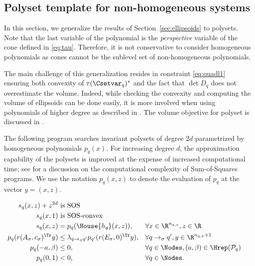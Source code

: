 \documentclass[11pt,twoside,a4paper,openright]{uclouvain-thesis}
\newcommand{\tr}{\to}
\newcommand{\trs}[1][\sigma]{\tr_{#1}}
\newcommand{\nqx}{n_{q,x}}
\newcommand{\Ps}{\mathcal{P}}
\begin{document}
\subsection{Polyset template for non-homogeneous systems}
\label{sec:controlsos}

In this section, we generalize the results of Section~\ref{sec:ellipsoids} to polysets.
Note that the last variable of the polynomial is the \emph{perspective} variable of the cone defined in \eqref{eq:tau}.
Therefore, it is not conservative to consider homogeneous polynomials as cones cannot be the sublevel set of non-homogeneous polynomials.

The main challenge of this generalization resides in constraint \eqref{eq:quadl1} ensuring both convexity of $\tau(\Csetvar_q)^*$ and the fact that $\det D_q$ does not overestimate the volume.
Indeed, while checking the convexity and computing the volume of ellipsoids can be done easily,
it is more involved when using polynomials of higher degree as described in .
The volume objective for polyset is discussed in .

The following program searches invariant polysets of degree $2d$ parametrized by homogeneous polynomials $p_q(x)$.
For increasing degree $d$, the approximation capability of the polysets is improved
at the expense of increased computational time; see  for a discussion on the computational complexity of Sum-of-Squares programs.
We use the notation $p_q(x, z)$ to denote the evaluation of $p_q$ at the vector $y = (x, z)$.

\begin{myprog}
  \label{prog:sos}
  \begin{align}
    \label{eq:sos}
    s_q(x, z) + z^{2d} & \text{ is SOS}\\
    \label{eq:sosconvex}
    s_q(x, 1) & \text{ is SOS-convex}\\
    \label{eq:sos_house}
    s_q(x, z) & = p_q(\House{h_q} (x, z)),
    && \forall x \in \R^{\nqx}, z \in \R\\
    \label{eq:soss}
    p_q(r(A_\sigma, c_\sigma)^\Tr y) & \leq \lambda_{q \trs q'} p_{q'}(r(E_\sigma, 0)^{\Tr} y),
    && \forall q \trs q', y \in \R^{\nqx+1}\\
    \label{eq:sosc}
    p_q(-a, \beta) & \leq 0,
    && \forall q \in \Nodes, (a, \beta) \in \Hrep(\Ps_q)\\
    \label{eq:sosf}
    p_q(0, 1) & < 0,
    && \forall q \in \Nodes.
  \end{align}
\end{myprog}
\end{document}
